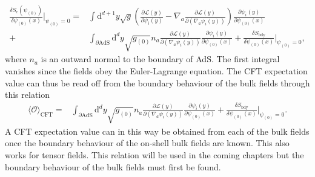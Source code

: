 \documentclass[12pt]{report}
\renewcommand{\d}{\ensuremath{\mathrm{d}}}
\renewcommand{\L}{\ensuremath{\mathcal{L}}}
\begin{document}
\begin{equation}
\begin{split}
\frac{\delta S_c(\psi_{(0)})}{\delta \psi_{(0)}(x)}|_{\psi_{(0)}=0}=&\int \d^{d+1}y\sqrt{g}\left(\frac{\partial\L(y)}{\partial \psi_i(y)}-\nabla_a\frac{\partial\L(y)}{\partial (\nabla_a\psi_i(y))}\right)\frac{\partial \psi_i(y)}{\partial \psi_{(0)}(x)}\\
+&\int_{\partial\mathrm{AdS}} \d^{d}y\sqrt{g_{(0)}}n_a\frac{\partial\L(y)}{\partial (\nabla_a\psi_i(y))}\frac{\partial \psi_i(y)}{\partial \psi_{(0)}(x)}+\frac{\delta S_{\mathrm{bdy}}}{\delta \psi_{(0)}(x)}|_{\psi_{(0)}=0},
\end{split}
\end{equation}
where $n_a$ is an outward normal to the boundary of AdS.
The first integral vanishes since the fields obey the Euler-Lagrange equation. The CFT expectation value can thus be read off from the boundary behaviour of the bulk fields through this relation
\begin{equation}
\begin{split}
\langle\mathcal{O}\rangle_{\mathrm{CFT}}=&\int_{\partial\mathrm{AdS}} \d^{d}y\sqrt{g_{(0)}}n_a\frac{\partial\L(y)}{\partial (\nabla_a\psi_i(y))}\frac{\partial \psi_i(y)}{\partial \psi_{(0)}(x)}+\frac{\delta S_{\mathrm{bdy}}}{\delta \psi_{(0)}(x)}|_{\psi_{(0)}=0}.\label{expFromBdy}
\end{split}
\end{equation}
A CFT expectation value can in this way be obtained from each of the bulk fields once the boundary behaviour of the on-shell bulk fields are known. This also works for tensor fields. This relation will be used in the coming chapters but the boundary behaviour of the bulk fields must first be found.
% 
\end{document}
